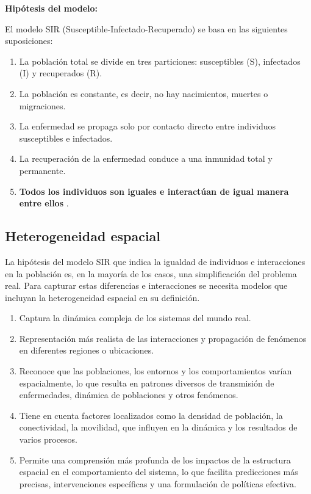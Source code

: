 \documentclass[fleqn,10pt]{SelfArx_063318} %
\begin{document}
\textbf{Hipótesis del modelo:}

El modelo SIR (Susceptible-Infectado-Recuperado) se basa en las siguientes suposiciones:
\begin{enumerate}
    \item La población total se divide en tres particiones: susceptibles (S), infectados (I) y recuperados (R).
    \item La población es constante, es decir, no hay nacimientos, muertes o migraciones.
    \item La enfermedad se propaga solo por contacto directo entre individuos susceptibles e infectados.
    \item La recuperación de la enfermedad conduce a una inmunidad total y permanente.
    \item \textbf{Todos los individuos son iguales e interactúan de igual manera entre ellos} \cite{ball2015seven}.
\end{enumerate}

\subsection{Heterogeneidad espacial}

La hipótesis del modelo SIR que indica la igualdad de individuos e interacciones en la población es, en la mayoría de
los casos, una simplificación del problema real. Para capturar estas diferencias e interacciones se necesita modelos
que incluyan la heterogeneidad espacial en su definición.

\begin{enumerate}
    \item Captura la dinámica compleja de los sistemas del mundo real.
    \item Representación más realista de las interacciones y
          propagación de fenómenos en diferentes regiones o ubicaciones.
    \item Reconoce que las poblaciones, los entornos y los comportamientos varían espacialmente, lo que resulta en
          patrones diversos de transmisión de enfermedades, dinámica de poblaciones y otros fenómenos.
    \item Tiene en cuenta factores localizados como la densidad de población, la conectividad, la movilidad,
          que influyen en la dinámica y los resultados de varios procesos.
    \item Permite una comprensión más profunda de los impactos de la estructura espacial en el comportamiento
          del sistema, lo que facilita predicciones más precisas, intervenciones específicas y una formulación de
          políticas efectiva.
\end{enumerate}
\end{document}
